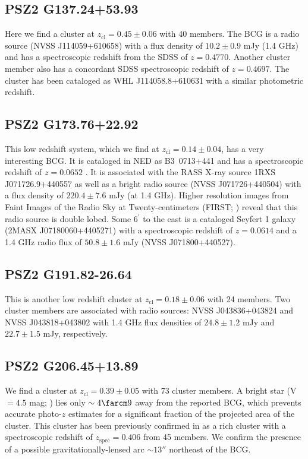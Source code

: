 \documentclass[apj, revtex4-1]{emulateapj}
\begin{document}
\subsection{PSZ2 G137.24+53.93} %
Here we find a cluster at $z_\mathrm{cl} = 0.45 \pm 0.06$ with 40 members. The BCG is a radio source (NVSS J114059+610658) with a flux density of $10.2 \pm 0.9$ mJy (1.4 GHz) and has a spectroscopic redshift from the SDSS of $z=0.4770$. Another cluster member also has a concordant SDSS spectroscopic redshift of $z=0.4697$. The cluster has been cataloged as WHL J114058.8+610631 with a similar photometric redshift.

\subsection{PSZ2 G173.76+22.92} %
This low redshift system, which we find at $z_\mathrm{cl} = 0.14 \pm 0.04$, has a very interesting BCG. It is cataloged in NED as \hbox{B3 0713+441} and has a spectroscopic redshift of $z=0.0652$ \citep{Bauer2000}. It is associated with the RASS X-ray source 1RXS J071726.9+440557 as well as a bright radio source (NVSS J071726+440504) with a flux density of $220.4\pm 7.6$ mJy (at 1.4 GHz). Higher resolution images from Faint Images of the Radio Sky at Twenty-centimeters (FIRST; \citealt{Becker1995}) reveal that this radio source is double lobed. Some 6$^\prime$ to the east is a cataloged Seyfert 1 galaxy (2MASX J07180060+4405271) with a spectroscopic redshift of $z=0.0614$ \citep{Michel1988} and a 1.4 GHz radio flux of $50.8 \pm 1.6 $ mJy (NVSS J071800+440527).


\subsection{PSZ2 G191.82-26.64} %
This is another low redshift cluster at $z_\mathrm{cl} = 0.18 \pm 0.06$ with 24 members. Two cluster members are associated with radio sources: NVSS J043836+043824 and NVSS J043818+043802 with 1.4 GHz flux densities of $24.8 \pm 1.2$ mJy and $22.7 \pm 1.5$ mJy, respectively.

\subsection{PSZ2 G206.45+13.89} %
We find a cluster at $z_\mathrm{cl} = 0.39 \pm 0.05$ with 73 cluster members. A bright star (V $= 4.5$ mag; \citealt{Hog2000}) lies only $\sim4\farcm9$ away from the reported BCG, which prevents accurate photo-$z$ estimates for a significant fraction of the projected area of the cluster. This cluster has been previously confirmed in \cite{Barrena2018} as a rich cluster with a spectroscopic redshift of $z_\mathrm{spec} = 0.406$ from 45 members. We confirm the presence of a possible gravitationally-lensed arc $\sim13''$ northeast of the BCG.
\end{document}
